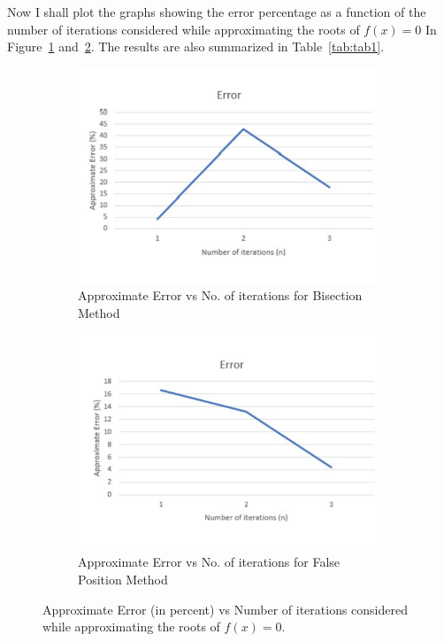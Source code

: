 \documentclass[titlepage, 11pt]{article}
\begin{document}
Now I shall plot the graphs showing the error percentage as a function of the number of iterations considered while approximating the roots of $f(x)=0$ In Figure~\ref{fig:fig2a} and~\ref{fig:fig2b}. The results are also summarized in Table~\ref{tab:tab1}.

\begin{figure}[ht]
\begin{subfigure}{.5\textwidth}
  \centering
  \includegraphics[width=\linewidth]{ApproxError1a.pdf}
  \caption{Approximate Error vs No. of iterations for Bisection Method}
  \label{fig:fig2a}
\end{subfigure}
\begin{subfigure}{.5\textwidth}
  \centering
  \includegraphics[width=\linewidth]{ApproxError1b.pdf}
  \caption{Approximate Error vs No. of iterations for False Position Method}
  \label{fig:fig2b}
\end{subfigure}
\caption{Approximate Error (in percent) vs Number of iterations considered while approximating the roots of $f(x)=0$.}
\label{fig:q1}
\end{figure}
\end{document}
